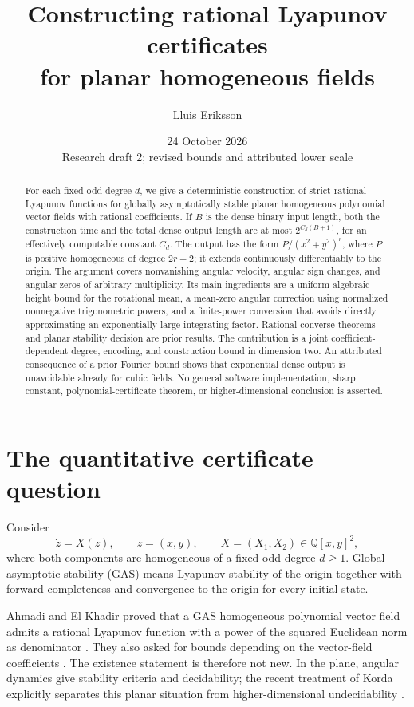 \documentclass[11pt]{article}
\title{Constructing rational Lyapunov certificates\\for planar homogeneous fields}
\author{Lluis Eriksson}
\date{24 October 2026\\\small Research draft 2; revised bounds and attributed lower scale}
\theoremstyle{remark}\newtheorem{remark}[theorem]{Remark}
\newcommand{\Q}{\mathbb Q}
\begin{document}
\maketitle
\begin{abstract}
For each fixed odd degree \(d\), we give a deterministic construction of strict rational Lyapunov functions for globally asymptotically stable planar homogeneous polynomial vector fields with rational coefficients. If \(B\) is the dense binary input length, both the construction time and the total dense output length are at most \(2^{C_d(B+1)}\), for an effectively computable constant \(C_d\). The output has the form \(P/(x^2+y^2)^r\), where \(P\) is positive homogeneous of degree \(2r+2\); it extends continuously differentiably to the origin. The argument covers nonvanishing angular velocity, angular sign changes, and angular zeros of arbitrary multiplicity. Its main ingredients are a uniform algebraic height bound for the rotational mean, a mean-zero angular correction using normalized nonnegative trigonometric powers, and a finite-power conversion that avoids directly approximating an exponentially large integrating factor. Rational converse theorems and planar stability decision are prior results. The contribution is a joint coefficient-dependent degree, encoding, and construction bound in dimension two. An attributed consequence of a prior Fourier bound shows that exponential dense output is unavoidable already for cubic fields. No general software implementation, sharp constant, polynomial-certificate theorem, or higher-dimensional conclusion is asserted.
\end{abstract}

\section{The quantitative certificate question}

Consider
\[
 \dot z=X(z),\qquad z=(x,y),\qquad
 X=(X_1,X_2)\in\Q[x,y]^2,
\]
where both components are homogeneous of a fixed odd degree \(d\geq1\).
Global asymptotic stability (GAS) means Lyapunov stability of the origin together with forward completeness and convergence to the origin for every initial state.

Ahmadi and El Khadir proved that a GAS homogeneous polynomial vector field admits a rational Lyapunov function with a power of the squared Euclidean norm as denominator \cite[Theorem 3.1]{AEK}. They also asked for bounds depending on the vector-field coefficients \cite[Section 7]{AEK}. The existence statement is therefore not new. In the plane, angular dynamics give stability criteria and decidability; the recent treatment of Korda explicitly separates this planar situation from higher-dimensional undecidability \cite{Korda,KordaSupp}.
\end{document}
